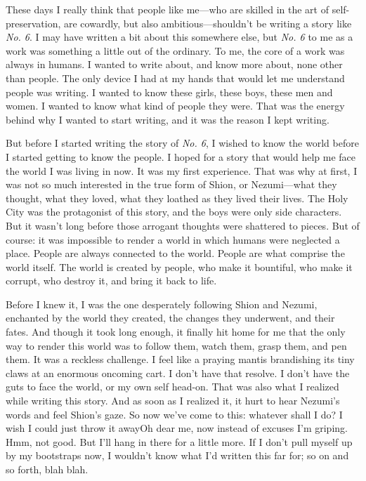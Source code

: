 These days I really think that people like me---who are skilled in the art
of self-preservation, are cowardly, but also ambitious---shouldn't be
writing a story like \emph{No. 6}. I may have written a bit about this
somewhere else, but \emph{No. 6} to me as a work was something a little out of
the ordinary. To me, the core of a work was always in humans. I wanted
to write about, and know more about, none other than people. The only
device I had at my hands that would let me understand people was
writing. I wanted to know these girls, these boys, these men and women.
I wanted to know what kind of people they were. That was the energy
behind why I wanted to start writing, and it was the reason I kept
writing.

But before I started writing the story of \emph{No. 6}, I wished to know the
world before I started getting to know the people. I hoped for a story
that would help me face the world I was living in now. It was my first
experience. That was why at first, I was not so much interested in the
true form of Shion, or Nezumi---what they thought, what they loved, what
they loathed as they lived their lives. The Holy City was the
protagonist of this story, and the boys were only side characters. But
it wasn't long before those arrogant thoughts were shattered to pieces.
But of course: it was impossible to render a world in which humans were
neglected a place. People are always connected to the world. People are
what comprise the world itself. The world is created by people, who make
it bountiful, who make it corrupt, who destroy it, and bring it back to
life.

Before I knew it, I was the one desperately following Shion and Nezumi,
enchanted by the world they created, the changes they underwent, and
their fates. And though it took long enough, it finally hit home for me
that the only way to render this world was to follow them, watch them,
grasp them, and pen them. It was a reckless challenge. I feel like a
praying mantis brandishing its tiny claws at an enormous oncoming cart.
I don't have that resolve. I don't have the guts to face the world, or
my own self head-on. That was also what I realized while writing this
story. And as soon as I realized it, it hurt to hear Nezumi's words and
feel Shion's gaze. So now we've come to this: whatever shall I do? I
wish I could just throw it away\el Oh dear me, now instead of excuses
I'm griping. Hmm, not good. But I'll hang in there for a little more. If
I don't pull myself up by my bootstraps now, I wouldn't know what I'd
written this far for; so on and so forth, blah blah.

